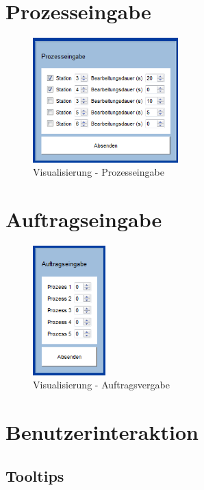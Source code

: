 \section{Prozesseingabe}

\begin{figure}[htb]
    \centering
    \includegraphics[width=0.5\textwidth]{Abbildungen/Prozesseingabe.png}
    \caption{Visualisierung - Prozesseingabe}		
    \label{fig:Prozesseingabe}
\end{figure}

\section{Auftragseingabe}

\begin{figure}[htb]
    \centering
    \includegraphics[width=0.25\textwidth]{Abbildungen/Auftragsvergabe.png}
    \caption{Visualisierung - Auftragsvergabe}		
    \label{fig:Auftragsvergabe}
\end{figure}


\section{Benutzerinteraktion}

\subsection{Tooltips}
\label{sec:tooltips}


